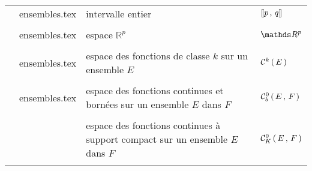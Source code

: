 \begin{tabularx}{\linewidth}{XXXX}
	\texttt{\intervaleint} & ensembles.tex & intervalle entier & $\llbracket p \, , \, q \rrbracket$ \\ \\

	\texttt{\R} & ensembles.tex & espace $\mathds R^p$ & $\R{p}$ \\ \\

	\texttt{\classespace} & ensembles.tex & espace des fonctions de classe $k$ sur un ensemble $E$ & $\mathcal C^{k} \left( \, E \, \right)$ \\ \\

	\texttt{\continuborne} & ensembles.tex & espace des fonctions continues et bornées sur un ensemble $E$ dans $F$ & $\mathcal C^0_b \left( \, E \,, \, F \, \right)$ \\ \\

	\texttt{\continusupportcompact} &  & espace des fonctions continues à support compact sur un ensemble $E$ dans $F$ & $\mathcal C^0_K \left( \, E \,, \, F \, \right)$ \\ \\
	
	
\end{tabularx}


